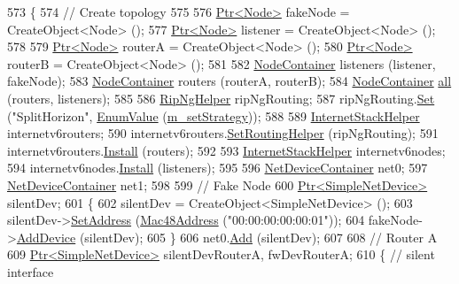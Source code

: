 \begin{DoxyCode}
573 \{
574   \textcolor{comment}{// Create topology}
575 
576   \hyperlink{classns3_1_1Ptr}{Ptr<Node>} fakeNode = CreateObject<Node> ();
577   \hyperlink{classns3_1_1Ptr}{Ptr<Node>} listener = CreateObject<Node> ();
578 
579   \hyperlink{classns3_1_1Ptr}{Ptr<Node>} routerA = CreateObject<Node> ();
580   \hyperlink{classns3_1_1Ptr}{Ptr<Node>} routerB = CreateObject<Node> ();
581 
582   \hyperlink{classns3_1_1NodeContainer}{NodeContainer} listeners (listener, fakeNode);
583   \hyperlink{classns3_1_1NodeContainer}{NodeContainer} routers (routerA, routerB);
584   \hyperlink{classns3_1_1NodeContainer}{NodeContainer} \hyperlink{buildings__pathloss_8m_a00a349297fa58bc80ff5329e25dcfe28}{all} (routers, listeners);
585 
586   \hyperlink{classns3_1_1RipNgHelper}{RipNgHelper} ripNgRouting;
587   ripNgRouting.\hyperlink{classns3_1_1RipNgHelper_a878cd9a4171c1e53a9895cff51e0efd9}{Set} (\textcolor{stringliteral}{"SplitHorizon"}, \hyperlink{classns3_1_1EnumValue}{EnumValue} (\hyperlink{classIpv6RipngSplitHorizonStrategyTest_a5c2358f181884a3e4edbe045f839246a}{m\_setStrategy}));
588 
589   \hyperlink{classns3_1_1InternetStackHelper}{InternetStackHelper} internetv6routers;
590   internetv6routers.\hyperlink{classns3_1_1InternetStackHelper_a3e382c02df022dec79952a7eca8cd5ba}{SetRoutingHelper} (ripNgRouting);
591   internetv6routers.\hyperlink{classns3_1_1InternetStackHelper_a6645b412f31283d2d9bc3d8a95cebbc0}{Install} (routers);
592 
593   \hyperlink{classns3_1_1InternetStackHelper}{InternetStackHelper} internetv6nodes;
594   internetv6nodes.\hyperlink{classns3_1_1InternetStackHelper_a6645b412f31283d2d9bc3d8a95cebbc0}{Install} (listeners);
595 
596   \hyperlink{classns3_1_1NetDeviceContainer}{NetDeviceContainer} net0;
597   \hyperlink{classns3_1_1NetDeviceContainer}{NetDeviceContainer} net1;
598 
599   \textcolor{comment}{// Fake Node}
600   \hyperlink{classns3_1_1Ptr}{Ptr<SimpleNetDevice>} silentDev;
601   \{
602     silentDev = CreateObject<SimpleNetDevice> ();
603     silentDev->\hyperlink{classns3_1_1SimpleNetDevice_a968ef3e7318bac29d5f1d7d977029af4}{SetAddress} (\hyperlink{classns3_1_1Mac48Address}{Mac48Address} (\textcolor{stringliteral}{"00:00:00:00:00:01"}));
604     fakeNode->\hyperlink{classns3_1_1Node_a42ff83ee1d5d1649c770d3f5b62375de}{AddDevice} (silentDev);
605   \}
606   net0.\hyperlink{classns3_1_1NetDeviceContainer_a7ca8bc1d7ec00fd4fcc63869987fbda5}{Add} (silentDev);
607 
608   \textcolor{comment}{// Router A}
609   \hyperlink{classns3_1_1Ptr}{Ptr<SimpleNetDevice>} silentDevRouterA, fwDevRouterA;
610   \{ \textcolor{comment}{// silent interface}

\end{DoxyCode}
